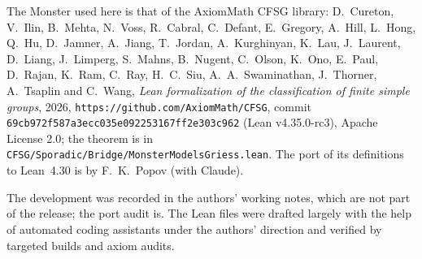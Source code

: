 The Monster used here is that of the AxiomMath CFSG library: D.~Cureton, V.~Ilin, B.~Mehta, N.~Voss, R.~Cabral, C.~Defant,
E.~Gregory, A.~Hill, L.~Hong, Q.~Hu, D.~Jamner, A.~Jiang, T.~Jordan, A.~Kurghinyan, K.~Lau, J.~Laurent, D.~Liang, J.~Limperg,
S.~Mahns, B.~Nugent, C.~Olson, K.~Ono, E.~Paul, D.~Rajan, K.~Ram, C.~Ray, H.~C.~Siu, A.~A.~Swaminathan, J.~Thorner, A.~Tsaplin and
C.~Wang, \emph{Lean formalization of the classification of finite simple groups}, 2026, \texttt{https://github.com/AxiomMath/CFSG},
commit \texttt{69cb972f587a3ecc035e092253167ff2e303c962} (Lean v4.35.0-rc3), Apache License 2.0; the theorem
 is in \texttt{CFSG/Sporadic/Bridge/MonsterModelsGriess.lean}.
The port of its definitions to Lean~4.30 is by F.~K.~Popov (with Claude).

The development was recorded in the authors' working notes, which are not part of the release; the port audit  is.  The Lean files were drafted largely with the help of automated coding assistants under the authors' direction and verified by targeted builds and axiom audits.

\endgroup
